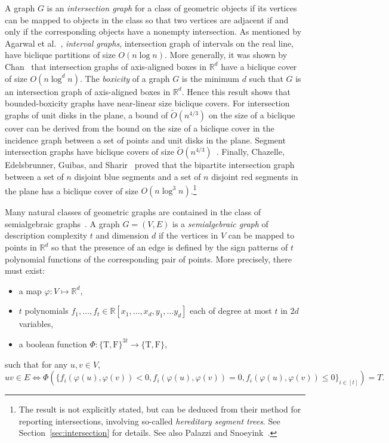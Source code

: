 \documentclass{amsart}
\newcommand{\darkblue}{\color{darkblue}} %
\newcommand{\defn}[1]{\textsl{\darkblue #1}} %
\begin{document}
A graph $G$ is an \defn{intersection graph} for a class of geometric objects if its vertices can be mapped to objects in the class so that two vertices are adjacent if and only if the corresponding objects have a nonempty intersection.
As mentioned by Agarwal et al.~\cite{AES24}, \defn{interval graphs}, intersection graph of intervals on the real line, have biclique partitions of size $O(n \log n)$. More generally, it was shown by Chan~\cite{cha06} that intersection graphs of axis-aligned boxes in $\mathbb{R}^d$ have a biclique cover of size $O(n \log^d n)$. The \defn{boxicity} of a graph $G$ is the minimum $d$ such that $G$ is an intersection graph of axis-aligned boxes in $\mathbb{R}^d$. Hence this result shows that bounded-boxicity graphs have near-linear size biclique covers.
For intersection graphs of unit disks in the plane, a bound of $\tilde{O}(n^{4/3})$ on the size of a biclique cover can be derived from the bound on the size of a biclique cover in the incidence graph between a set of points and unit disks in the plane. 
Segment intersection graphs have biclique covers of size $\tilde{O}(n^{4/3})$~\cite{MR1739610,AES24}.
Finally, Chazelle, Edelsbrunner, Guibas, and Sharir~\cite{CEGS94} proved that the bipartite intersection graph between a set of $n$ disjoint blue segments and a set of $n$ disjoint red segments in the plane has a biclique cover of size $O(n \log^3 n)$.\footnote{The result is not explicitly stated, but can be deduced from their method for reporting intersections, involving so-called \emph{hereditary segment trees}. See Section~\ref{sec:intersection} for details. See also Palazzi and Snoeyink~\cite{PS94}.} 

Many natural classes of geometric graphs are contained in the class of semialgebraic graphs~\cite{MR2156215, MR3217709, MR3646875, MR3425253}.
A graph $G=(V,E)$ is a \defn{semialgebraic graph} of description complexity $t$ and dimension $d$ if the vertices in $V$ can be mapped to points in $\mathbb{R}^d$ so that the presence of an edge is defined by the sign patterns of $t$ polynomial functions of the corresponding pair of points. More precisely, there must exist:
\begin{itemize}
\item a map $\varphi: V\mapsto \mathbb{R}^d$,
\item $t$ polynomials $f_1,\ldots, f_t\in \mathbb{R}[x_1,\ldots, x_d, y_1,\ldots y_d]$ each of degree at most $t$ in $2d$ variables,
\item a boolean function $\Phi:\{\text{T},\text{F}\}^{3t}\rightarrow \{\text{T},\text{F}\}$,
\end{itemize}
such that for any $u,v \in V$, 
\[
uv \in E \Leftrightarrow
\Phi\left(\{f_i(\varphi(u), \varphi(v))<0,f_i(\varphi(u), \varphi(v))=0,f_i(\varphi(u), \varphi(v))\leq 0\}_{i\in [t]}\right)=T.
\]
 
\end{document}
